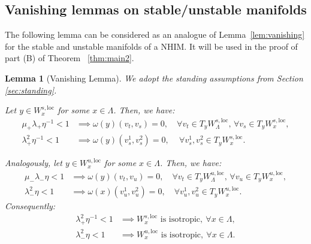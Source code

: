 \documentclass[11pt]{amsart}
\newtheorem{lem}[thm]{Lemma}
\theoremstyle{definition}
\theoremstyle{remark}
\numberwithin{equation}{section}
\begin{document}
\subsection{Vanishing lemmas on stable/unstable manifolds}

The following lemma can be considered as
an analogue of Lemma~\ref{lem:vanishing} for the stable and unstable manifolds
of a NHIM.
It will be used in the proof of part {\rm (B)} of Theorem~ \ref{thm:main2}.


\begin{lem}[Vanishing Lemma]
\label{lem:vanishingmanifolds}
We adopt the standing assumptions from Section \ref{sec:standing}.

Let $y\in W^{s,\mathrm{loc}}_x$ for some $x \in \Lambda$.
Then,  we have:
\begin{equation}
\label{eqn:vanishingstable}
\begin{split}
\mu_+ \lambda_+ \eta^{-1}  < 1 &\implies  \omega(y)(v_t,v_s)= 0, \quad \forall v_t\in T_yW^{s,\mathrm{loc}}_\Lambda,
\, \forall v_s\in T_y W_x^{s,\mathrm{loc}} ,\\
\lambda_+^2 \eta^{-1}<1 & \implies  \omega(y)(v^1_s,v^2_s)=0, \quad \, \forall v^1_s,  v^2_s\in T_yW^{s,\mathrm{loc}}_x.
\end{split}
\end{equation}

Analogously, let $y\in W^{u,\mathrm{loc}}_x$ for some $x \in \Lambda$.
Then,  we have:
\begin{equation}
\label{eqn:vanishingunstable}
\begin{split}
\mu_- \lambda_- \eta  < 1 & \implies  \omega(y)(v_t,v_u)= 0, \quad \forall v_t\in T_yW^{u,\mathrm{loc}}_\Lambda,
\, \forall v_u\in T_yW^{u,\mathrm{loc}}_x,
\\
\lambda_-^2 \eta < 1 & \implies  \omega(x)(v^1_u,v^2_u)=0, \quad  \forall v^1_u , v^2_u\in T_yW^{u,\mathrm{loc}}_x.
\end{split}
\end{equation}
Consequently:
\begin{equation} \label{eqn:vanishing_manifolds}
\begin{split}
\lambda_+^2 \eta^{-1}<1 & \implies W^{s,\mathrm{loc}}_x \textrm{ is isotropic},\ \forall x\in \Lambda,\\
\lambda_- ^2 \eta  < 1 &  \implies W^{u,\mathrm{loc}}_x \textrm{ is isotropic}, \ \forall x\in \Lambda.
\end{split}
\end{equation}
\end{lem}
\end{document}
